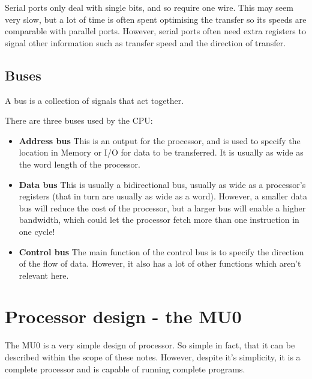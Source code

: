 \documentclass{article}
\begin{document}
Serial ports only deal with single bits, and so require one wire. This may seem
very slow, but a lot of time is often spent optimising the transfer so its
speeds are comparable with parallel ports. However, serial ports often need
extra registers to signal other information such as transfer speed and the
direction of transfer.

\subsection{Buses}

A bus is a collection of signals that act together.

There are three buses used by the CPU:

\begin{itemize}
	\item {\bf Address bus}
		This is an output for the processor, and is used to specify the location
		in Memory or I/O for data to be transferred. It is usually as wide as
		the word length of the processor.
	
	\item {\bf Data bus}
		This is usually a bidirectional bus, usually as wide as a processor's
		registers (that in turn are usually as wide as a word). However, a
		smaller data bus will reduce the cost of the processor, but a larger bus
		will enable a higher bandwidth, which could let the processor fetch more
		than one instruction in one cycle!

	\item {\bf Control bus}
		The main function of the control bus is to specify the direction of the
		flow of data. However, it also has a lot of other functions which aren't
		relevant here.
\end{itemize}

\section{Processor design - the MU0}

The MU0 is a very simple design of processor. So simple in fact, that it can be
described within the scope of these notes. However, despite it's simplicity, it
is a complete processor and is capable of running complete programs.
\end{document}
